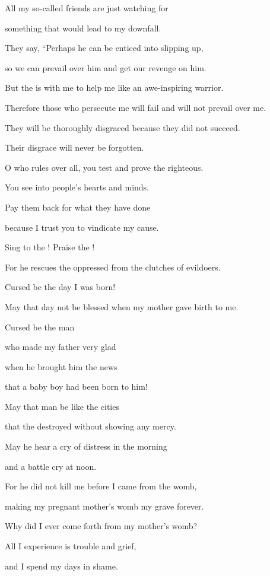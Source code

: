 {\par }{\Q All
my so-called
friends
are just watching
for
\par }{\Q something that would lead to my downfall.
\par }{\Q They say, “Perhaps
he can be enticed
into slipping up,
\par }{\Q so we can prevail over
him and get
our revenge
on him.
\par }{\Q {}But the
{}
is with
me to help me like an awe-inspiring
warrior.
\par }{\Q Therefore
those who persecute
me will fail
and will not
prevail
over
me.
\par }{\Q They will be thoroughly
disgraced
because
they did not
succeed.
\par }{\Q Their disgrace
will never
be forgotten.
\par }{\Q {}O
{}
who rules over all,
you test
and prove the righteous.
\par }{\Q You see
into people’s hearts
and minds.
\par }{\Q Pay
them back
for what they
have done
\par }{\Q because
I trust you to vindicate
my cause.
\par }{\Q {}Sing
to the
{}! Praise
the {}!
\par }{\Q For
he rescues
the oppressed from the clutches
of evildoers.
\par }{\Q {}Cursed
be the day
I was born!
\par }{\Q May that day
not
be
blessed
when my mother
gave birth to me.
\par }{\Q {}Cursed
be the man
\par }{\Q who
made my father
very glad
\par }{\Q when he brought him the news
\par }{\Q that a baby
boy
had been
born to him!
\par }{\Q {}May that man
be like the cities
\par }{\Q that
the
{}
destroyed
without
showing
any mercy.
\par }{\Q May he hear
a cry of distress
in the morning
\par }{\Q and a battle cry
at noon.
\par }{\Q {}For he did not
kill
me before I came from the womb,
\par }{\Q making my pregnant
mother’s
womb
my grave
forever.
\par }{\Q {}Why
did I ever
come forth
from my mother’s womb?
\par }{\Q All
I experience
is trouble
and grief,
\par }{\Q and I spend
my days
in shame.

}
